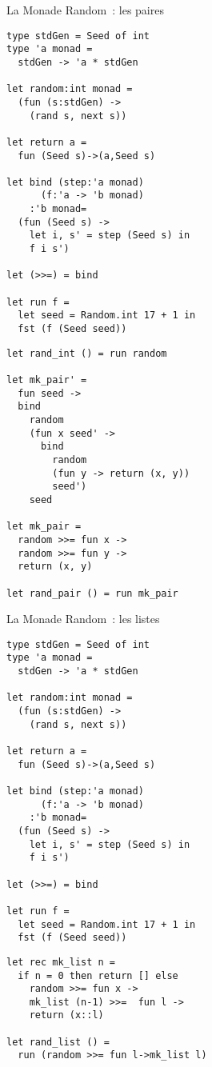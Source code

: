 \documentclass[10pt]{beamer}
\begin{document}
\begin{frame}[fragile]{La Monade Random~: les paires}
  \begin{multicols*}{2}
\begin{verbatim}
type stdGen = Seed of int
type 'a monad =
  stdGen -> 'a * stdGen

let random:int monad =
  (fun (s:stdGen) ->
    (rand s, next s))

let return a =
  fun (Seed s)->(a,Seed s)

let bind (step:'a monad)
      (f:'a -> 'b monad)
    :'b monad=
  (fun (Seed s) ->
    let i, s' = step (Seed s) in
    f i s')

let (>>=) = bind

let run f =
  let seed = Random.int 17 + 1 in
  fst (f (Seed seed))
\end{verbatim}
    \columnbreak{}
\begin{verbatim}
let rand_int () = run random

let mk_pair' =
  fun seed ->
  bind
    random
    (fun x seed' ->
      bind
        random
        (fun y -> return (x, y))
        seed')
    seed

let mk_pair =
  random >>= fun x ->
  random >>= fun y ->
  return (x, y)

let rand_pair () = run mk_pair
\end{verbatim}
  \end{multicols*}
\end{frame}

\begin{frame}[fragile]{La Monade Random~: les listes}
  \begin{multicols*}{2}
\begin{verbatim}
type stdGen = Seed of int
type 'a monad =
  stdGen -> 'a * stdGen

let random:int monad =
  (fun (s:stdGen) ->
    (rand s, next s))

let return a =
  fun (Seed s)->(a,Seed s)

let bind (step:'a monad)
      (f:'a -> 'b monad)
    :'b monad=
  (fun (Seed s) ->
    let i, s' = step (Seed s) in
    f i s')

let (>>=) = bind

let run f =
  let seed = Random.int 17 + 1 in
  fst (f (Seed seed))
\end{verbatim}
    \columnbreak{}
\begin{verbatim}
let rec mk_list n =
  if n = 0 then return [] else
    random >>= fun x ->
    mk_list (n-1) >>=  fun l ->
    return (x::l)

let rand_list () =
  run (random >>= fun l->mk_list l)
\end{verbatim}
  \end{multicols*}
\end{frame}
\end{document}
